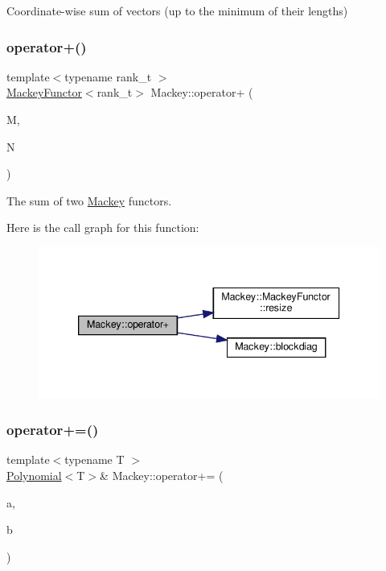 Coordinate-\/wise sum of vectors (up to the minimum of their lengths) 

\mbox{\label{namespaceMackey_a738f2b46b7d0c37be203a17083801bbd}} 
\subsubsection{\texorpdfstring{operator+()}{operator+()}\hspace{0.1cm}{\footnotesize\ttfamily [3/3]}}
{\footnotesize\ttfamily template$<$typename rank\+\_\+t $>$ \\
\hyperlink{classMackey_1_1MackeyFunctor}{Mackey\+Functor}$<$rank\+\_\+t$>$ Mackey\+::operator+ (\begin{DoxyParamCaption}\item[{const \hyperlink{classMackey_1_1MackeyFunctor}{Mackey\+Functor}$<$ rank\+\_\+t $>$ \&}]{M,  }\item[{const \hyperlink{classMackey_1_1MackeyFunctor}{Mackey\+Functor}$<$ rank\+\_\+t $>$ \&}]{N }\end{DoxyParamCaption})}



The sum of two \hyperlink{namespaceMackey}{Mackey} functors. 

Here is the call graph for this function\+:\nopagebreak
\begin{figure}[H]
\begin{center}
\leavevmode
\includegraphics[width=339pt]{namespaceMackey_a738f2b46b7d0c37be203a17083801bbd_cgraph}
\end{center}
\end{figure}
\mbox{\label{namespaceMackey_a29199dd05885558a19e305b49ab7b180}} 
\subsubsection{\texorpdfstring{operator+=()}{operator+=()}}
{\footnotesize\ttfamily template$<$typename T $>$ \\
\hyperlink{classMackey_1_1Polynomial}{Polynomial}$<$T$>$\& Mackey\+::operator+= (\begin{DoxyParamCaption}\item[{\hyperlink{classMackey_1_1Polynomial}{Polynomial}$<$ T $>$ \&}]{a,  }\item[{const \hyperlink{classMackey_1_1Polynomial}{Polynomial}$<$ T $>$ \&}]{b }\end{DoxyParamCaption})}

